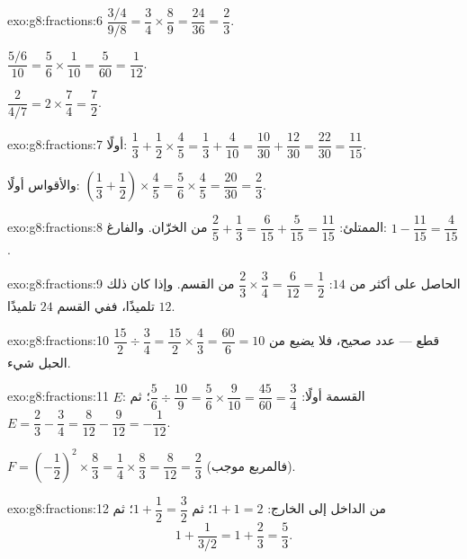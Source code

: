 \begin{solution}{exo:g8:fractions:6}
$\dfrac{3/4}{9/8} = \dfrac34 \times \dfrac89 = \dfrac{24}{36} =
\dfrac23$.

$\dfrac{5/6}{10} = \dfrac56 \times \dfrac{1}{10} = \dfrac{5}{60} =
\dfrac{1}{12}$.

$\dfrac{2}{4/7} = 2 \times \dfrac74 = \dfrac72$.
\end{solution}

\begin{solution}{exo:g8:fractions:7}
 أولًا:
$\dfrac13 + \dfrac12 \times \dfrac45 = \dfrac13 + \dfrac{4}{10}
= \dfrac{10}{30} + \dfrac{12}{30} = \dfrac{22}{30} = \dfrac{11}{15}$.

والأقواس أولًا:
$\left(\dfrac13 + \dfrac12\right) \times \dfrac45
= \dfrac56 \times \dfrac45 = \dfrac{20}{30} = \dfrac23$.
\end{solution}

\begin{solution}{exo:g8:fractions:8}
الممتلئ: $\dfrac25 + \dfrac13 = \dfrac{6}{15} + \dfrac{5}{15} =
\dfrac{11}{15}$ من الخزّان. والفارغ:
$1 - \dfrac{11}{15} = \dfrac{4}{15}$.
\end{solution}

\begin{solution}{exo:g8:fractions:9}
 الحاصل على أكثر من $14$:
$\dfrac23 \times \dfrac34 = \dfrac{6}{12} = \dfrac12$ من القسم.
وإذا كان ذلك $12$ تلميذًا، ففي القسم $24$ تلميذًا.
\end{solution}

\begin{solution}{exo:g8:fractions:10}
$\dfrac{15}{2} \div \dfrac34 = \dfrac{15}{2} \times \dfrac43
= \dfrac{60}{6} = 10$ قطع --- عدد صحيح، فلا يضيع من الحبل شيء.
\end{solution}

\begin{solution}{exo:g8:fractions:11}
$E$: القسمة أولًا:
$\dfrac56 \div \dfrac{10}{9} = \dfrac56 \times \dfrac{9}{10}
= \dfrac{45}{60} = \dfrac34$؛ ثم
$E = \dfrac23 - \dfrac34 = \dfrac{8}{12} - \dfrac{9}{12} =
-\dfrac{1}{12}$.

$F = \left(-\dfrac12\right)^2 \times \dfrac83 = \dfrac14 \times
\dfrac83 = \dfrac{8}{12} = \dfrac23$ (فالمربع موجب).
\end{solution}

\begin{solution}{exo:g8:fractions:12}
من الداخل إلى الخارج: $1 + 1 = 2$؛ ثم
$1 + \dfrac12 = \dfrac32$؛ ثم
\[
1 + \frac{1}{3/2} = 1 + \frac23 = \frac53 .
\]
\end{solution}

